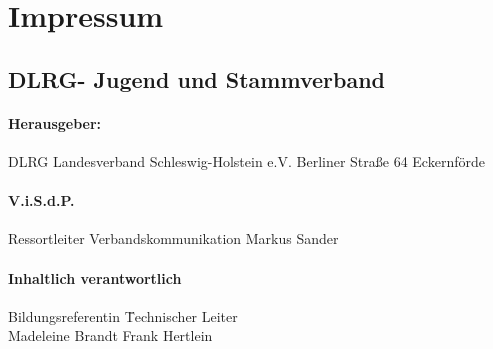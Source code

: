 

\renewcommand\myheadingtext{Gesamtverband | Impressum}

\section*{Impressum}
\subsection*{DLRG- Jugend und Stammverband}
\paragraph{Herausgeber:}
DLRG Landesverband Schleswig-Holstein e.V.\newline
Berliner Straße 64 Eckernförde
\paragraph{V.i.S.d.P.}
Ressortleiter Verbandskommunikation\newline
Markus Sander
\paragraph{Inhaltlich verantwortlich}
\begin{tabbing}
Bildungsreferentin \=	Technischer Leiter\\	
Madeleine Brandt \> Frank Hertlein\\
\end{tabbing} 

